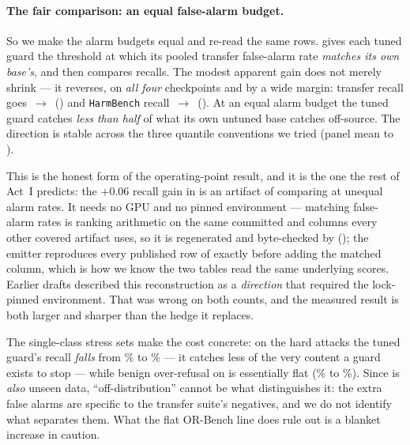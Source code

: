 \paragraph{The fair comparison: an equal false-alarm budget.} So we make the alarm budgets equal and
re-read the same rows.  gives each tuned guard the threshold at which its pooled
transfer false-alarm rate \emph{matches its own base's}, and then compares recalls. The modest apparent
gain does not merely shrink --- it reverses, on \emph{all four} checkpoints and by a wide margin: transfer recall goes \MatchedTransferBase{}\,$\to$\,\MatchedTransferSft{}
(\MatchedTransferDelta) and \texttt{HarmBench} recall \MatchedHarmBase{}\,$\to$\,\MatchedHarmSft{}
(\MatchedHarmDelta). At an equal alarm budget the tuned guard catches \emph{less than half} of what its
own untuned base catches off-source. The direction is stable across the three quantile conventions we
tried (panel mean \MatchedStabilityLo{} to \MatchedStabilityHi).

This is the honest form of the operating-point result, and it is the one the rest of Act~I predicts: the
$+0.06$ recall gain in  is an artifact of comparing at unequal alarm rates. It needs
no GPU and no pinned environment --- matching false-alarm rates is ranking arithmetic on the same
committed  and  columns every other covered artifact uses, so it is
regenerated and byte-checked by  (); the emitter reproduces every
published row of  exactly before adding the matched column, which is how we know the
two tables read the same underlying scores. Earlier drafts described this reconstruction as a
\emph{direction} that required the lock-pinned environment. That was wrong on both counts, and the
measured result is both larger and sharper than the hedge it replaces.

The single-class stress sets make the cost concrete: on the hard
 attacks the tuned guard's recall \emph{falls} from \HarmBenchBaseRecallPct\% to
\HarmBenchSFTRecallPct\% --- it catches less of the very content a guard exists to stop --- while
benign over-refusal on  is essentially flat (\ORBenchBaseFPRPct\% to \ORBenchSFTFPRPct\%).
Since  is \emph{also} unseen data, ``off-distribution'' cannot be what distinguishes it:
the extra false alarms are specific to the transfer suite's negatives, and we do not identify what
separates them. What the flat OR-Bench line does rule out is a blanket increase in caution.

